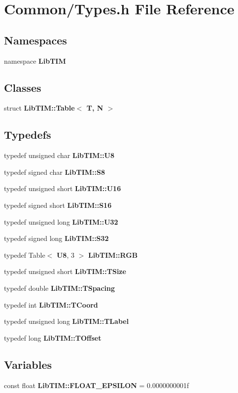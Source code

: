 \section{Common/Types.h File Reference}
\label{Types_8h}
\subsection*{Namespaces}
\begin{CompactItemize}
\item 
namespace {\bf Lib\-TIM}
\end{CompactItemize}
\subsection*{Classes}
\begin{CompactItemize}
\item 
struct {\bf Lib\-TIM::Table$<$ T, N $>$}
\end{CompactItemize}
\subsection*{Typedefs}
\begin{CompactItemize}
\item 
typedef unsigned char {\bf Lib\-TIM::U8}
\item 
typedef signed char {\bf Lib\-TIM::S8}
\item 
typedef unsigned short {\bf Lib\-TIM::U16}
\item 
typedef signed short {\bf Lib\-TIM::S16}
\item 
typedef unsigned long {\bf Lib\-TIM::U32}
\item 
typedef signed long {\bf Lib\-TIM::S32}
\item 
typedef Table$<$ {\bf U8}, 3 $>$ {\bf Lib\-TIM::RGB}
\item 
typedef unsigned short {\bf Lib\-TIM::TSize}
\item 
typedef double {\bf Lib\-TIM::TSpacing}
\item 
typedef int {\bf Lib\-TIM::TCoord}
\item 
typedef unsigned long {\bf Lib\-TIM::TLabel}
\item 
typedef long {\bf Lib\-TIM::TOffset}
\end{CompactItemize}
\subsection*{Variables}
\begin{CompactItemize}
\item 
const float {\bf Lib\-TIM::FLOAT\_\-EPSILON} = 0.0000000001f
\end{CompactItemize}
